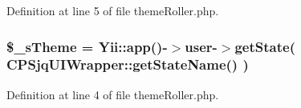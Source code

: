 Definition at line 5 of file themeRoller.php.

\hypertarget{themeRoller_8php_a720977afada196d223efa00a1dc85976}{
\subsubsection[{\$\_\-sTheme}]{\setlength{\rightskip}{0pt plus 5cm}\$\_\-sTheme = Yii::app()-\/$>$user-\/$>$getState( CPSjqUIWrapper::getStateName() )}}
\label{themeRoller_8php_a720977afada196d223efa00a1dc85976}


Definition at line 4 of file themeRoller.php.

